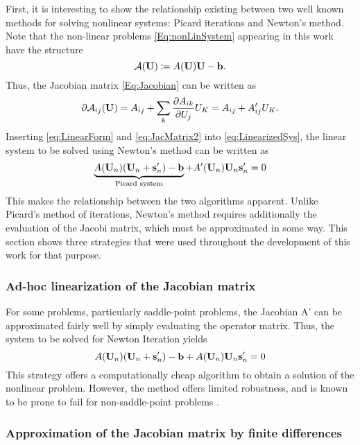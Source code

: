 First, it is interesting to show the relationship existing between two well known methods for solving nonlinear systems: Picard iterations and Newton's method. Note that the non-linear problems \cref{Eq:nonLinSystem} appearing in this work have the structure
\begin{equation}
	\mathcal{A}(\textbf{U}) \coloneqq  A(\textbf{U})\textbf{U}-\textbf{b}. \label{eq:LinearForm}
\end{equation}
Thus, the Jacobian matrix \cref{Eq:Jacobian} can be written as
\begin{equation}
	\partial \mathcal{A}_{ij}(\textbf{U})  = A_{ij} + \sum_k \frac{\partial A_{ik}}{\partial U_j} U_K = A_{ij} + A'_{ij}U_K.\label{eq:JacMatrix2}
\end{equation}
Inserting \cref{eq:LinearForm} and  \cref{eq:JacMatrix2} into \cref{eq:LinearizedSys}, the linear system to be solved using Newton's method can be written as
\begin{equation}
	\underbrace{A(\textbf{U}_n)(\textbf{U}_n+\textbf{s}'_n) - \textbf{b}}_{\text{Picard system}} + A'(\textbf{U}_n)\textbf{U}_n\textbf{s}'_n = 0
\end{equation}
This makes the relationship between the two algorithms apparent. Unlike Picard's method of iterations, Newton's method requires additionally the evaluation of the Jacobi matrix, which must be approximated in some way. This section shows three strategies that were used throughout the development of this work for that purpose.

\subsubsection{Ad-hoc linearization of the Jacobian matrix}
For some problems, particularly saddle-point problems, the Jacobian A' can be approximated fairly well by simply evaluating the operator matrix. Thus, the system to be solved for Newton Iteration yields
\begin{equation}
	A(\textbf{U}_n)(\textbf{U}_n+\textbf{s}'_n) - \textbf{b} + A(\textbf{U}_n)\textbf{U}_n\textbf{s}'_n = 0
\end{equation}
This strategy offers a computationally cheap algorithm to obtain a solution of the nonlinear problem. However, the method offers limited robustness, and is known to be prone to fail for non-saddle-point problems \parencite{kikkerHighOrderEXtendedDiscontinuous2020}. 

\subsubsection{Approximation of the Jacobian matrix by finite differences}

